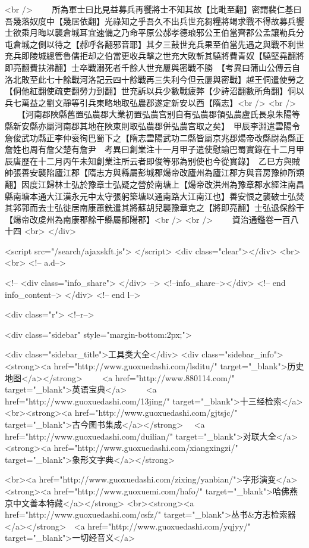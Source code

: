 <br />
　　所為軍士曰比見益募兵再饗將士不知其故【比毗至翻】密謂裴仁基曰吾幾落奴度中【幾居依翻】光祿知之乎吾久不出兵世充芻糧將竭求戰不得故募兵饗士欲乘月晦以襲倉城耳宜速備之乃命平原公郝孝德琅邪公王伯當齊郡公孟讓勒兵分屯倉城之側以待之【郝呼各翻邪音耶】其夕三鼔世充兵果至伯當先遇之與戰不利世充兵即陵城總管魯儒拒却之伯當更收兵擊之世充大敗斬其驍將費青奴【驍堅堯翻將即亮翻費扶沸翻】士卒戰溺死者千餘人世充屢與密戰不勝　【考異曰蒲山公傳云自洛北敗至此七十餘戰河洛記云四十餘戰再三失利今但云屢與密戰】越王侗遣使勞之【侗他紅翻使疏吏翻勞力到翻】世充訴以兵少數戰疲弊【少詩沼翻數所角翻】侗以兵七萬益之劉文靜等引兵東略地取弘農郡遂定新安以西【隋志】<br />
<br />
　　【河南郡陜縣舊置弘農郡大業初置弘農宫别自有弘農郡領弘農盧氏長泉朱陽等縣新安縣亦屬河南郡其地在陜東則取弘農郡併弘農宫取之矣】　甲辰李淵遣雲陽令詹俊武功縣正李仲衮徇巴蜀下之【隋志雲陽武功二縣皆屬京兆郡煬帝改縣尉為縣正詹姓也周有詹父楚有詹尹　考異曰創業注十一月甲子遣使慰諭巴蜀實錄在十二月甲辰唐歷在十二月丙午未知創業注所云者即俊等邪為别使也今從實錄】　乙巳方與賊帥張善安襲陷廬江郡【隋志方與縣屬彭城郡煬帝改廬州為廬江郡方與音房豫帥所類翻】因度江歸林士弘於豫章士弘疑之營於南塘上【煬帝改洪州為豫章郡水經注南昌縣南塘本通大江漢永元中太守張躬築塘以通南路大江南江也】善安恨之襲破士弘焚其郛郭而去士弘徙居南康蕭銑遣其將蘇胡兒襲豫章克之【將即亮翻】士弘退保餘干【煬帝改䖍州為南康郡餘干縣屬鄱陽郡】<br />
<br />
　　資治通鑑卷一百八十四  <br>
   </div> 

<script src="/search/ajaxskft.js"> </script>
 <div class="clear"></div>
<br>
<br>
 <!-- a.d-->

 <!--
<div class="info_share">
</div> 
-->
 <!--info_share--></div>   <!-- end info_content-->
  </div> <!-- end l-->

<div class="r">   <!--r-->



<div class="sidebar"  style="margin-bottom:2px;">

 
<div class="sidebar_title">工具类大全</div>
<div class="sidebar_info">
<strong><a href="http://www.guoxuedashi.com/lsditu/" target="_blank">历史地图</a></strong>　　
<a href="http://www.880114.com/" target="_blank">英语宝典</a>　　
<a href="http://www.guoxuedashi.com/13jing/" target="_blank">十三经检索</a>　
<br><strong><a href="http://www.guoxuedashi.com/gjtsjc/" target="_blank">古今图书集成</a></strong>　
<a href="http://www.guoxuedashi.com/duilian/" target="_blank">对联大全</a>　<strong><a href="http://www.guoxuedashi.com/xiangxingzi/" target="_blank">象形文字典</a></strong>　

<br><a href="http://www.guoxuedashi.com/zixing/yanbian/">字形演变</a>　　<strong><a href="http://www.guoxuemi.com/hafo/" target="_blank">哈佛燕京中文善本特藏</a></strong>
<br><strong><a href="http://www.guoxuedashi.com/csfz/" target="_blank">丛书&方志检索器</a></strong>　<a href="http://www.guoxuedashi.com/yqjyy/" target="_blank">一切经音义</a>　　

